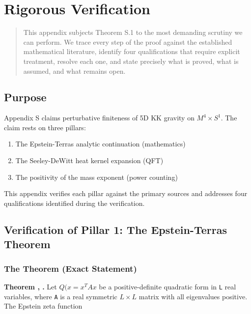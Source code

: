 \documentclass[aps,prd,preprint,superscriptaddress,longbibliography,floatfix]{revtex4-2}
\theoremstyle{remark}
\begin{document}
\section{Rigorous Verification}


\begin{quote}
This appendix subjects Theorem S.1 to the most demanding scrutiny we can
perform. We trace every step of the proof against the established
mathematical literature, identify four qualifications that require explicit
treatment, resolve each one, and state precisely what is proved, what is
assumed, and what remains open.
\end{quote}



\subsection{Purpose}

Appendix S claims perturbative finiteness of 5D KK gravity on $M^{4} \times S^{1}$. The claim rests on three pillars:


\begin{enumerate}
  \item The Epstein-Terras analytic continuation (mathematics)
  \item The Seeley-DeWitt heat kernel expansion (QFT)
  \item The positivity of the mass exponent (power counting)
\end{enumerate}

This appendix verifies each pillar against the primary sources and addresses four qualifications identified during the verification.



\subsection{Verification of Pillar 1: The Epstein-Terras Theorem}


\subsubsection{The Theorem (Exact Statement)}

\textbf{Theorem \cite{Epstein1903}, \cite{Terras1985}.} Let $Q(x = x^T A x$ be a positive-definite quadratic form in \texttt{L} real variables, where \texttt{A} is a real symmetric $L \times L$ matrix with all eigenvalues positive. The Epstein zeta function
\end{document}
